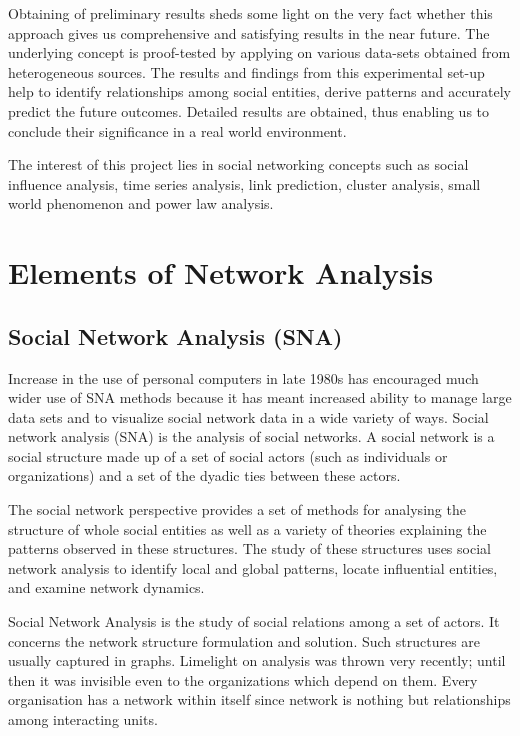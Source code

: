 Obtaining of preliminary results sheds some light on the very fact whether this approach gives us comprehensive
and satisfying results in the near future. The underlying concept is proof-tested by applying on various data-sets
obtained from heterogeneous sources. The results and findings from this experimental set-up help to identify
relationships among social entities, derive patterns and accurately predict the future outcomes. Detailed
results are obtained, thus enabling us to conclude their significance in a real world environment.

The interest of this project lies in social networking concepts such as social influence analysis,
time series analysis, link prediction, cluster analysis, small world phenomenon and power law analysis.

\section{Elements of Network Analysis}

\subsection{Social Network Analysis (SNA)}

Increase in the use of personal computers in late 1980s has encouraged much wider use of SNA  methods because it has meant increased ability to manage large data sets and to visualize social network data in a wide variety of ways. Social network analysis (SNA) is the analysis of social networks. A social network is a social structure made up of a set of social actors (such as individuals or organizations) and a set of the dyadic ties between these actors.

The social network perspective provides a set of methods for analysing the structure of whole social entities as well as a variety of theories explaining the patterns observed in these structures. The study of these structures uses social network analysis to identify local and global patterns, locate influential entities, and examine network dynamics.

Social Network Analysis is the study of social relations among a set of actors. It concerns the network structure formulation and solution. Such structures are usually captured in graphs. Limelight on analysis was thrown very recently; until then it was invisible even to the organizations which depend on them. Every organisation has a network within itself since network is nothing but relationships among interacting units.

